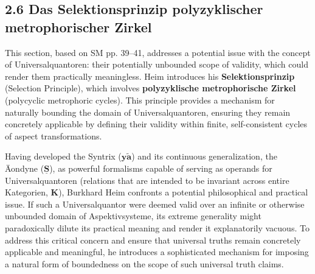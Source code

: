 \documentclass[12pt]{article}
\newcommand{\kategorie}{\bm{K}}
\newcommand{\syntrix}{\bm{y\widetilde{a}}}
\begin{document}
\subsection{2.6 Das Selektionsprinzip polyzyklischer metrophorischer Zirkel}
\label{sec:selektionsprinzip}

This section, based on SM pp. 39--41, addresses a potential issue with the concept of Universalquantoren: their potentially unbounded scope of validity, which could render them practically meaningless. Heim introduces his \textbf{Selektionsprinzip} (Selection Principle), which involves \textbf{polyzyklische metrophorische Zirkel} (polycyclic metrophoric cycles). This principle provides a mechanism for naturally bounding the domain of Universalquantoren, ensuring they remain concretely applicable by defining their validity within finite, self-consistent cycles of aspect transformations.

Having developed the Syntrix (\(\syntrix\)) and its continuous generalization, the Äondyne (\(\underline{\bm{S}}\)), as powerful formalisms capable of serving as operands for Universalquantoren (relations that are intended to be invariant across entire Kategorien, \(\kategorie\)), Burkhard Heim confronts a potential philosophical and practical issue. If such a Universalquantor were deemed valid over an infinite or otherwise unbounded domain of Aspektivsysteme, its extreme generality might paradoxically dilute its practical meaning and render it explanatorily vacuous. To address this critical concern and ensure that universal truths remain concretely applicable and meaningful, he introduces a sophisticated mechanism for imposing a natural form of boundedness on the scope of such universal truth claims.
\end{document}
